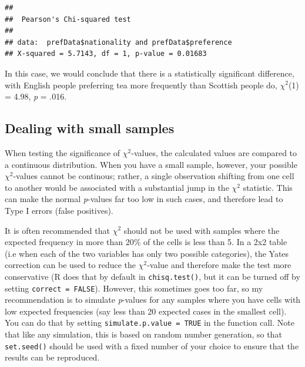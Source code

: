 \documentclass[
]{book}
\newenvironment{Shaded}{\begin{snugshade}}{\end{snugshade}}
\newcommand{\DataTypeTok}[1]{\textcolor[rgb]{0.13,0.29,0.53}{#1}}
\newcommand{\KeywordTok}[1]{\textcolor[rgb]{0.13,0.29,0.53}{\textbf{#1}}}
\newcommand{\NormalTok}[1]{#1}
\newcommand{\OperatorTok}[1]{\textcolor[rgb]{0.81,0.36,0.00}{\textbf{#1}}}
\newcommand{\OtherTok}[1]{\textcolor[rgb]{0.56,0.35,0.01}{#1}}
\begin{document}
\begin{Shaded}
\end{Shaded}

\begin{verbatim}
## 
## 	Pearson's Chi-squared test
## 
## data:  prefData$nationality and prefData$preference
## X-squared = 5.7143, df = 1, p-value = 0.01683
\end{verbatim}

In this case, we would conclude that there is a statistically significant difference, with English people preferring tea more frequently than Scottish people do, \(\chi^2\)(1) = 4.98, \emph{p} = .016.

\hypertarget{dealing-with-small-samples}{%
\subsection{Dealing with small samples}\label{dealing-with-small-samples}}

When testing the significance of \(\chi^2\)-values, the calculated values are compared to a continuous distribution. When you have a small sample, however, your possible \(\chi^2\)-values cannot be continous; rather, a single observation shifting from one cell to another would be associated with a substantial jump in the \(\chi^2\) statistic. This can make the normal \emph{p}-values far too low in such cases, and therefore lead to Type I errors (false positives).

It is often recommended that \(\chi^2\) should not be used with samples where the expected frequency in more than 20\% of the cells is less than 5. In a 2x2 table (i.e when each of the two variables has only two possible categories), the Yates correction can be used to reduce the \(\chi^2\)-value and therefore make the test more conservative (R does that by default in \texttt{chisq.test()}, but it can be turned off by setting \texttt{correct\ =\ FALSE}). However, this sometimes goes too far, so my recommendation is to simulate \emph{p}-values for any samples where you have cells with low expected frequencies (say less than 20 expected cases in the smallest cell). You can do that by setting \texttt{simulate.p.value\ =\ TRUE} in the function call. Note that like any simulation, this is based on random number generation, so that \texttt{set.seed()} should be used with a fixed number of your choice to ensure that the results can be reproduced.
\end{document}
